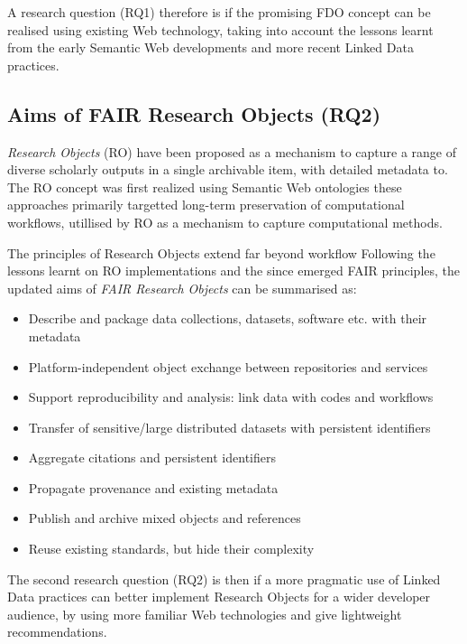 A research question (RQ1) therefore is if the promising FDO concept can be realised using existing Web technology, taking into account the lessons learnt from the early Semantic Web developments and more recent Linked Data practices. 


\subsection{Aims of FAIR Research Objects (RQ2)}

\emph{Research Objects} (RO) \cite{Bechhofer 2013} have been proposed as a mechanism to capture a range of diverse scholarly outputs in a single archivable item, with detailed metadata to. The RO concept was first realized using Semantic Web ontologies \cite{ch5-92,Belhajjame 2015} these approaches primarily targetted long-term preservation of computational workflows, utillised by RO as a mechanism to capture computational methods.

The principles of Research Objects extend far beyond workflow
\cite{Leipzig 2021,Atkinson 2017}
Following the lessons learnt on RO implementations and the since emerged FAIR principles, the updated aims of \emph{FAIR Research Objects} can be summarised as:

\begin{itemize}
    \item Describe and package data collections, datasets, software etc. with their metadata
    \item Platform-independent object exchange between repositories and services
    \item Support reproducibility and analysis: link data with codes and workflows
    \item Transfer of sensitive/large distributed datasets with persistent identifiers
    \item Aggregate citations and persistent identifiers
    \item Propagate provenance and existing metadata
    \item Publish and archive mixed objects and references
    \item Reuse existing standards, but hide their complexity
\end{itemize}

The second research question (RQ2) is then if a more pragmatic use of Linked Data practices can better implement Research Objects for a wider developer audience, by using more familiar Web technologies and give lightweight recommendations.


